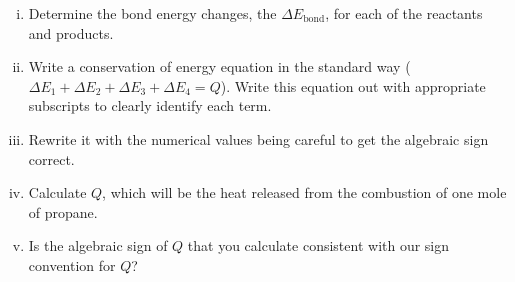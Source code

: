\begin{enumerate}[(a)]
	\begin{enumerate}[i.]
		\item Determine the bond energy changes, the $\Delta E_\text{bond}$, for each of the reactants and products.
		\item Write a conservation of energy equation in the standard way  ($\Delta E_1 + \Delta E_2 + \Delta E_3 + \Delta E_4 = Q$). Write this equation out with appropriate subscripts to clearly identify each term.
		\item Rewrite it with the numerical values being careful to get the algebraic sign correct.
		\item Calculate $Q$, which will be the heat released from the combustion of one mole of propane.
		\item Is the algebraic sign of $Q$ that you calculate consistent with our sign convention for $Q$?
	\end{enumerate}
\end{enumerate}